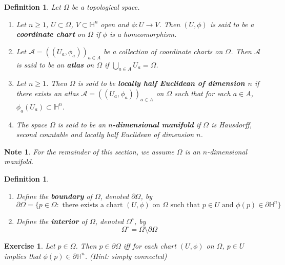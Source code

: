 \documentclass[12pt]{amsart}
\newtheorem{defn}[thm]{Definition}
\newtheorem{note}[thm]{Note}
\newtheorem{ex}[thm]{Exercise}
\newcommand{\Om}{\Omega}
\renewcommand{\H}{\mathbb{H}}
\newcommand{\MA}{\mathcal{A}}
\begin{document}
	\begin{defn}
		Let $\Om$ be a topological space.
		\begin{enumerate}
			\item Let $n \geq 1$, $U \subset \Om$, $V \subset \H^n$ open and $\phi:U \rightarrow V$. Then $(U, \phi)$ is said to be a \textbf{coordinate chart} on $\Om$ if $\phi$ is a homeomorphism. 
			\item Let $\MA = ((U_a,\phi_{a}))_{a \in A}$ be a collection of coordinate charts on $\Om$. Then $\MA$ is said to be an \textbf{atlas} on $\Om$ if  $\bigcup\limits_{a \in A} U_a = \Om$.
			\item Let $n \geq 1$. Then $\Om$ is said to be \textbf{locally half Euclidean of dimension $n$} if there exists an atlas $\MA = ((U_a,\phi_{a}))_{a \in A}$ on $\Om$ such that for each $a \in A$, $\phi_a(U_a) \subset \H^n$.
			\item The space $\Om$ is said to be an \textbf{$n$-dimensional manifold} if $\Om$ is Hausdorff, second countable and locally half Euclidean of dimension $n$. 
		\end{enumerate}
	\end{defn}

	\begin{note}
		For the remainder of this section, we assume $\Om$ is an $n$-dimensional manifold.
	\end{note}

	\begin{defn}\
		\begin{enumerate}
			\item Define the 
			\textbf{boundary} of $\Om$, denoted $\partial \Om$, by $$\partial \Om = \{p \in \Om: \text{ there exists a chart } (U, \phi) \text{ on } \Om \text{ such that } p \in U \text{ and } \phi(p) \in \partial \H^n\}$$
			\item Define the 
			\textbf{interior} of $\Om$, denoted $\Om^{\circ}$, by $$\Om^{\circ} = \Om \setminus \partial \Om$$
		\end{enumerate}
	\end{defn}

	\begin{ex}
		Let $p \in \Om$. Then $p \in \partial \Om$ iff for each chart $(U, \phi)$ on $\Om$, $p \in U$ implies that $\phi(p) \in \partial \H^n$. (Hint: simply connected)
	\end{ex}
\end{document}
